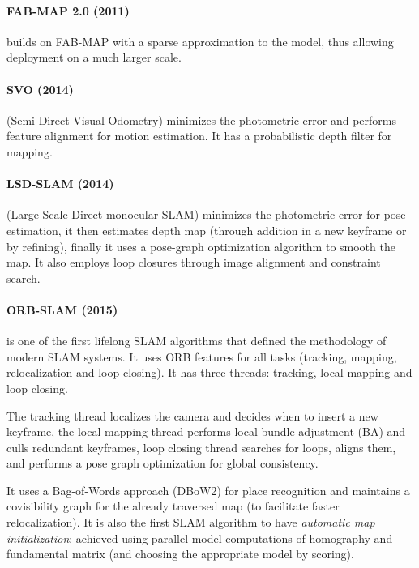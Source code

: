 \paragraph{FAB-MAP 2.0 (2011) \cite{Cummins2011AppearanceonlySA}}
builds on FAB-MAP with a sparse approximation to the model, thus
allowing deployment on a much larger scale.

\paragraph{SVO (2014) \cite{Forster2014SVOFS}} (Semi-Direct Visual
Odometry) minimizes the photometric error and performs feature
alignment for motion estimation. It has a probabilistic depth filter
for mapping.

\paragraph{LSD-SLAM (2014) \cite{Engel2014LSDSLAMLD}} (Large-Scale
Direct monocular SLAM) minimizes the photometric error for pose
estimation, it then estimates depth map (through addition in a new
keyframe or by refining), finally it uses a pose-graph optimization
algorithm to smooth the map. It also employs loop closures through
image alignment and constraint search.

\paragraph{ORB-SLAM (2015) \cite{MurArtal2015ORBSLAMAV}} is one of the
first lifelong SLAM algorithms that defined the methodology of modern
SLAM systems. It uses ORB features \cite{Rublee2011ORBAE} for all
tasks (tracking, mapping, relocalization and loop closing). It has
three threads: tracking, local mapping and loop closing. 

The tracking thread localizes the camera and decides when to insert a
new keyframe, the local mapping thread performs local bundle
adjustment (BA) and culls redundant keyframes, loop closing thread
searches for loops, aligns them, and performs a pose graph
optimization for global consistency. 

It uses a Bag-of-Words approach (DBoW2) for place recognition and
maintains a covisibility graph for the already traversed map (to
facilitate faster relocalization). It is also the first SLAM algorithm
to have \emph{automatic map initialization}; achieved using parallel
model computations of homography and fundamental matrix (and choosing
the appropriate model by scoring).

